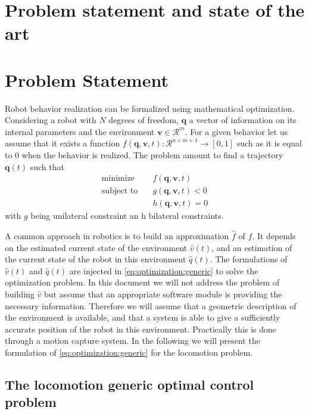 \section*{Problem statement and state of the art}

\section*{Problem Statement}
\label{sec:locomotion}

Robot behavior realization can be formalized using mathematical optimization.
Considering a robot with $N$ degrees of freedom, $\bm q$ a vector of information on its internal parameters and the environment ${\bm v} \in \mathcal{R}^m$.
For a given behavior let us assume that it exists a function
$f({\bm q},{\bm v},t):\mathcal{R}^{n \times m+1} \rightarrow [0,1]$
such as it is equal to $0$ when the behavior is realized.
The problem amount to find a trajectory ${\bm q}(t)$ such that
\begin{align}
\label{eq:optimization:generic}
\text{minimize}   &\quad f({\bm q},{\bm v},t) \\
\text{subject to} &\quad
g({\bm q},{\bm v},t) < 0 \nonumber \\
&\quad h({\bm q},{\bm v},t) = 0 \nonumber
\end{align}
with $g$ being unilateral constraint an h bilateral constraints.

A common approach in robotics is to build an approximation $\hat{f}$ of $f$.
It depends on the estimated current state of the environment $\hat{v}(t)$, and an estimation of the current state of the robot in this environment $\hat{q}(t)$.
The formulations of $\hat{v}(t)$ and $\hat{q}(t)$ are injected in \eqref{eq:optimization:generic} to solve the optimization problem.
In this document we will not address the problem of building $\hat{v}$ but assume that an appropriate software module is providing the necessary information. Therefore we will assume that a geometric description of the environment is available, and that a system is able to give a sufficiently accurate position of the robot in this environment. Practically this is done through a motion capture system.
In the following we will present the formulation of \eqref{eq:optimization:generic} for the locomotion problem.

\subsection*{The locomotion generic optimal control problem}

